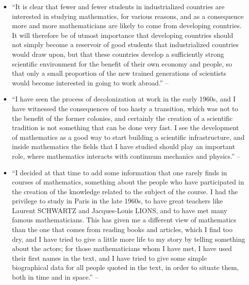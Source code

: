 \documentclass[oneside]{book}
\numberwithin{equation}{section}
\begin{document}
\begin{enumerate}
\begin{itemize}
		\item ``It is clear that fewer and fewer students in industrialized countries are interested in studying mathematics, for various reasons, and as a consequence more and more mathematicians are likely to come from developing countries. It will therefore be of utmost importance that developing countries should not simply become a reservoir of good students that industrialized countries would draw upon, but that these countries develop a sufficiently strong scientific environment for the benefit of their own economy and people, so that only a small proportion of the new trained generations of scientists would become interested in going to work abroad.'' -- \cite[Preface, p. ix]{Tartar2006}
		\item ``I have seen the process of decolonization at work in the early 1960s, and I have witnessed the consequences of too hasty a transition, which was not to the benefit of the former colonies, and certainly the creation of a scientific tradition is not something that can be done very fast. I see the development of mathematics as a good way to start building a scientific infrastructure, and inside mathematics the fields that I have studied should play an important role, where mathematics interacts with continuum mechanics and physics.'' -- \cite[Preface, pp. ix--x]{Tartar2006}
		\item ``I decided at that time to add some information that one rarely finds in courses of mathematics, something about the people who have participated in the creation of the knowledge related to the subject of the course. I had the privilege to study in Paris in the late 1960s, to have great teachers like Laurent SCHWARTZ and Jacques-Louis LIONS, and to have met many famous mathematicians. This has given me a different view of mathematics than the one that comes from reading books and articles, which I find too dry, and I have tried to give a little more life to my story by telling something about the actors; for those mathematicians whom I have met, I have used their first names in the text, and I have tried to give some simple biographical data for all people quoted in the text, in order to situate them, both in time and in space.'' -- \cite[Preface, p. x]{Tartar2006}

\end{itemize}
\end{enumerate}
\end{document}
